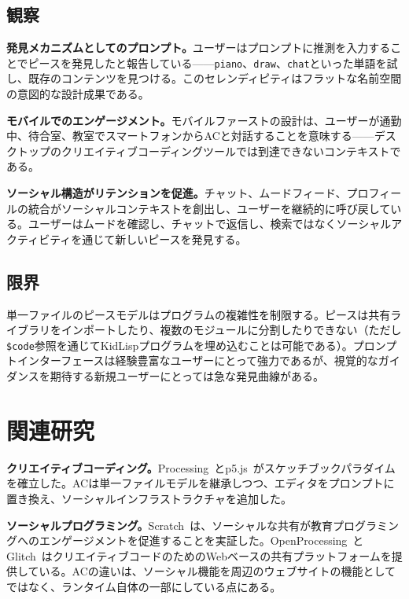 \documentclass[10pt,letterpaper,twocolumn]{article}
\begin{document}
\subsection{観察}

\textbf{発見メカニズムとしてのプロンプト。}ユーザーはプロンプトに推測を入力することでピースを発見したと報告している——\texttt{piano}、\texttt{draw}、\texttt{chat}といった単語を試し、既存のコンテンツを見つける。このセレンディピティはフラットな名前空間の意図的な設計成果である。

\textbf{モバイルでのエンゲージメント。}モバイルファーストの設計は、ユーザーが通勤中、待合室、教室でスマートフォンからACと対話することを意味する——デスクトップのクリエイティブコーディングツールでは到達できないコンテキストである。

\textbf{ソーシャル構造がリテンションを促進。}チャット、ムードフィード、プロフィールの統合がソーシャルコンテキストを創出し、ユーザーを継続的に呼び戻している。ユーザーはムードを確認し、チャットで返信し、検索ではなくソーシャルアクティビティを通じて新しいピースを発見する。

\subsection{限界}

単一ファイルのピースモデルはプログラムの複雑性を制限する。ピースは共有ライブラリをインポートしたり、複数のモジュールに分割したりできない（ただし\texttt{\$code}参照を通じてKidLispプログラムを埋め込むことは可能である）。プロンプトインターフェースは経験豊富なユーザーにとって強力であるが、視覚的なガイダンスを期待する新規ユーザーにとっては急な発見曲線がある。


\section{関連研究}

\textbf{クリエイティブコーディング。}Processing~\citep{reas2007processing}とp5.js~\citep{mccarthy2015p5js}がスケッチブックパラダイムを確立した。ACは単一ファイルモデルを継承しつつ、エディタをプロンプトに置き換え、ソーシャルインフラストラクチャを追加した。

\textbf{ソーシャルプログラミング。}Scratch~\citep{resnick2009scratch}は、ソーシャルな共有が教育プログラミングへのエンゲージメントを促進することを実証した。OpenProcessing~\citep{openprocessing2009}とGlitch~\citep{glitch2017}はクリエイティブコードのためのWebベースの共有プラットフォームを提供している。ACの違いは、ソーシャル機能を周辺のウェブサイトの機能としてではなく、ランタイム自体の一部にしている点にある。
\end{document}
